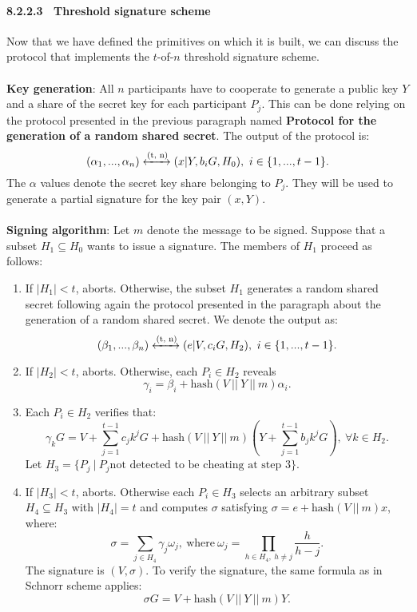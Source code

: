 \paragraph{8.2.2.3 \ Threshold signature scheme}
Now that we have defined the primitives on which it is built, we can discuss the protocol that implements the $t$-of-$n$ threshold signature scheme. 
\\
\\
{\bf Key generation}: All $n$ participants have to cooperate to generate a public key $Y$ and a share of the secret key for each participant $P_j$. This can be done relying on the protocol presented in the previous paragraph named {\bf Protocol for the generation of a random shared secret}. The output of the protocol is:
$$(\alpha_1, ..., \alpha_n) \xleftrightarrow{\text{(t, n)}} (x|Y, b_iG, H_0), \ i \in \{1, ..., t - 1\}.$$
The $\alpha$ values denote the secret key share belonging to $P_j$. They will be used to generate a partial signature for the key pair $(x, Y)$.
\\
\\
{\bf Signing algorithm}: Let $m$ denote the message to be signed. Suppose that a subset $H_1 \subseteq H_0$ wants to issue a signature. The members of $H_1$ proceed as follows:
\begin{enumerate}
	\item If $|H_1| < t$, aborts. Otherwise, the subset $H_1$ generates a random shared secret following again the protocol presented in the paragraph about the generation of a random shared secret. We denote the output as:
	$$(\beta_1, ..., \beta_n) \xleftrightarrow{\text{(t, n)}} (e|V, c_iG, H_2), \ i \in \{1, ..., t - 1\}.$$
	\item If $|H_2| < t$, aborts. Otherwise, each $P_i \in H_2$ reveals
	$$\gamma_i = \beta_i + \text{hash}(V \ || \ Y \ || \ m)\alpha_i.$$
	\item Each $P_i \in H_2$ verifies that:
	$$\gamma_kG = V + \sum_{j = 1}^{t - 1} c_jk^jG + \text{hash}(V \ || \ Y \ || \ m)\left(Y + \sum_{j = 1}^{t - 1}b_jk^jG\right), \ \forall k \in H_2.$$
	Let $H_3 = \{P_j \ | \ P_j \text{not detected to be cheating at step 3}\}$.
	\item If $|H_3| < t$, aborts. Otherwise each $P_i \in H_3$ selects an arbitrary subset $H_4 \subseteq H_3$ with $|H_4| = t$ and computes $\sigma$ satisfying $\sigma = e + \text{hash}(V \ || \ m)x$, where:
	$$\sigma = \sum_{j \in H_4}\gamma_j\omega_j, \ \text{where} \ \omega_j = \prod_{h \in H_4, \ h \neq j}\frac{h}{h - j}.$$
	The signature is $(V, \sigma)$. To verify the signature, the same formula as in Schnorr scheme applies:
	$$\sigma G = V + \text{hash}(V \ || \ Y \ || \ m)Y.$$
\end{enumerate}
